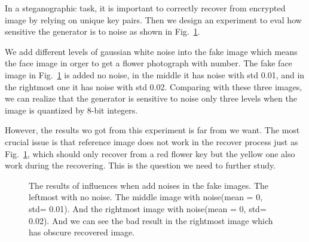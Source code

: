 \documentclass[a4paper]{article}
\begin{document}
	In a steganographic task, it is important to correctly recover from encrypted image by relying on unique key pairs. Then we design an experiment to eval how sensitive the generator is to noise as shown in Fig.~\ref{p6}.
	
    We add different levels of gaussian white noise into the fake image which means the face image in orger to get a flower photograph with number. The fake face image in Fig.~\ref{p6} is added no noise, in the middle it has noise with std 0.01, and in the rightmost one it has noise with std 0.02. Comparing with these three images, we can realize that the generator is sensitive to noise only three levels when the image is quantized by 8-bit integers.
	
	However, the results wo got from this experiment is far from we want. The most crucial issue is that reference image does not work in the recover process just as Fig.~\ref{p6}, which should only recover from a red flower key but the yellow one also work during the recovering. This is the question we need to further study.
		
\begin{figure}
	\centering 
	\caption{The results of influences when add noises in the fake images. The leftmost with no noise. The middle image with noise(mean = 0, std= 0.01). And the rightmost image with noise(mean = 0, std= 0.02). And we can see the bad result in the rightmost image which has obscure recovered image.}
	\label{p6}
\end{figure}
	
\end{document}
